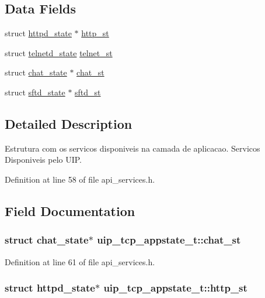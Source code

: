\subsection*{Data Fields}
\begin{DoxyCompactItemize}
\item 
struct \hyperlink{structhttpd__state}{httpd\_\-state} $\ast$ \hyperlink{unionuip__tcp__appstate__t_adcc71c14f09466646d27ac07f09ba93b}{http\_\-st}
\item 
struct \hyperlink{structtelnetd__state}{telnetd\_\-state} \hyperlink{unionuip__tcp__appstate__t_af10d0b33b40d5ae1075d368defa5fc6d}{telnet\_\-st}
\item 
struct \hyperlink{structchat__state}{chat\_\-state} $\ast$ \hyperlink{unionuip__tcp__appstate__t_ac96ca91f1ee7161c6be9fceee00241e1}{chat\_\-st}
\item 
struct \hyperlink{structsftd__state}{sftd\_\-state} $\ast$ \hyperlink{unionuip__tcp__appstate__t_a5f2ba5964f99bb49f519409bd2f72722}{sftd\_\-st}
\end{DoxyCompactItemize}


\subsection{Detailed Description}
Estrutura com os servicos disponiveis na camada de aplicacao. Servicos Disponiveis pelo UIP. 

Definition at line 58 of file api\_\-services.h.



\subsection{Field Documentation}
\hypertarget{unionuip__tcp__appstate__t_ac96ca91f1ee7161c6be9fceee00241e1}{
\subsubsection[{chat\_\-st}]{\setlength{\rightskip}{0pt plus 5cm}struct {\bf chat\_\-state}$\ast$ {\bf uip\_\-tcp\_\-appstate\_\-t::chat\_\-st}}}
\label{unionuip__tcp__appstate__t_ac96ca91f1ee7161c6be9fceee00241e1}


Definition at line 61 of file api\_\-services.h.

\hypertarget{unionuip__tcp__appstate__t_adcc71c14f09466646d27ac07f09ba93b}{
\subsubsection[{http\_\-st}]{\setlength{\rightskip}{0pt plus 5cm}struct {\bf httpd\_\-state}$\ast$ {\bf uip\_\-tcp\_\-appstate\_\-t::http\_\-st}}}
\label{unionuip__tcp__appstate__t_adcc71c14f09466646d27ac07f09ba93b}


